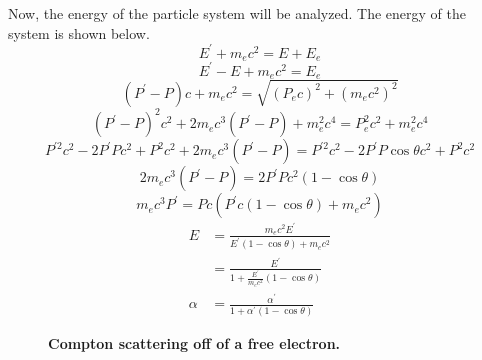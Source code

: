 Now, the energy of the particle system will be analyzed. The energy of the
system is shown below.
\begin{equation*}
  E^{'} + m_ec^2 = E + E_e
\end{equation*}
\begin{equation*}
  E^{'}-E + m_ec^2 = E_e
\end{equation*}
\begin{equation*}
  (P^{'} - P)c + m_ec^2 = \sqrt{\left(P_ec\right)^2 + \left(m_ec^2\right)^2}
\end{equation*}
\begin{equation*}
  (P^{'} - P)^2c^2 + 2m_ec^3(P^{'} - P) + m_e^2c^4 = P_e^2c^2 + m_e^2c^4
\end{equation*}
\begin{equation*}
  P^{'2}c^2 - 2P^{'}Pc^2 + P^2c^2 + 2m_ec^3(P^{'} - P) = P^{'2}c^2 - 
  2P^{'}P\cos{\theta}c^2 + P^2c^2
\end{equation*}
\begin{equation*}
  2m_ec^3(P^{'} - P) = 2P^{'}Pc^2(1 - \cos{\theta})
\end{equation*}
\begin{equation*}
  m_ec^3P^{'} = Pc(P^{'}c(1 - \cos{\theta}) + m_ec^2)
\end{equation*}
\begin{align}
  E & = \frac{m_ec^2E^{'}}{E^{'}(1 - \cos{\theta}) + m_ec^2} \nonumber \\
  & = \frac{E^{'}}{1 + \frac{E^{'}}{m_ec^2}(1 - \cos{\theta})} \\
  \alpha & = \frac{\alpha^{'}}{1 + \alpha^{'}(1 - \cos{\theta})} 
\end{align}

\begin{figure}[t!]
  \begin{center}
  \end{center}
  \caption{\textbf{Compton scattering off of a free electron.}}
  \label{fig:compton_scatter_free_electron}
\end{figure}

